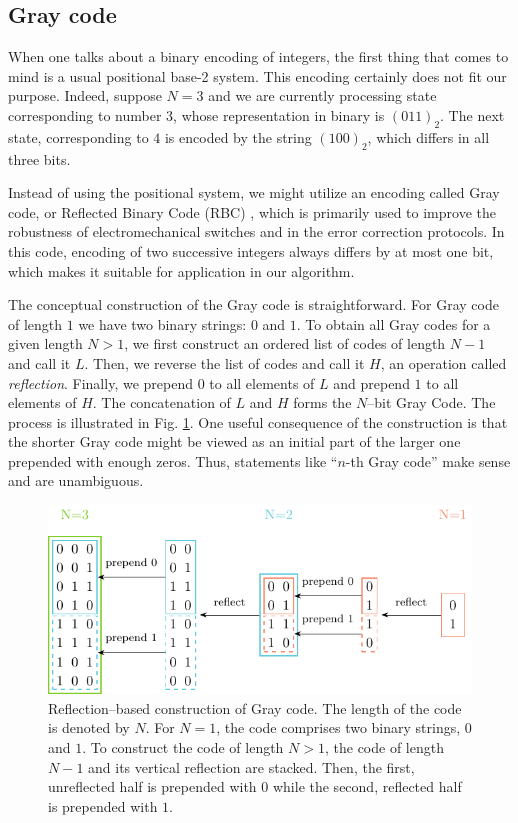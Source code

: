 \subsection{Gray code}
When one talks about a binary encoding of integers, the first thing that comes
to mind is a usual positional base-2 system. This encoding certainly does not
fit our purpose. Indeed, suppose $N=3$ and we are currently processing state
corresponding to number $3$, whose representation in binary is $(011)_{2}$. The
    next state, corresponding to $4$ is encoded by the string $(100)_{2}$, which
differs in all three bits.

Instead of using the positional system, we might utilize an encoding called
Gray code, or Reflected Binary Code (RBC) \cite{gray,lucal1959}, which is
primarily used to improve the robustness of electromechanical switches and in
the error correction protocols. In this code, encoding of two successive
integers always differs by at most one bit, which makes it suitable for
application in our algorithm.

The conceptual construction of the Gray code is straightforward. For Gray code
of length $1$ we have two binary strings: $0$ and $1$. To obtain all Gray codes
for a given length $N > 1$, we first construct an ordered list of codes of
length $N-1$ and call it $L$. Then, we reverse the list of codes and call it
$H$, an operation called \emph{reflection}. Finally, we prepend $0$ to all
elements of $L$ and prepend $1$ to all elements of $H$. The concatenation of
$L$ and $H$ forms the $N$--bit Gray Code. The process is illustrated in Fig.
\ref{fig:gray}. One useful consequence of the construction is that the shorter
Gray code might be viewed as an initial part of the larger one prepended with
enough zeros. Thus, statements like ``$n$-th Gray code'' make sense and are
unambiguous.

\begin{figure}
  \includegraphics[width=\textwidth]{figures/gray.pdf}
  \caption{Reflection--based construction of Gray code. The length of the code is denoted
    by $N$. For $N=1$, the code comprises two binary strings, $0$ and $1$. To
    construct the code of length $N>1$, the code of length $N-1$ and its vertical
    reflection are stacked. Then, the first, unreflected half is prepended with $0$
    while the second, reflected half is prepended with $1$.} \label{fig:gray}
\end{figure}

